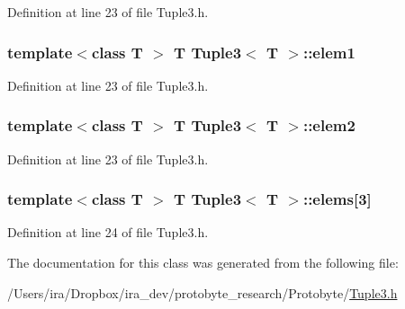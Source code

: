 Definition at line 23 of file Tuple3.\-h.

\hypertarget{class_tuple3_ac4a0bc9d329cd769ee09034011d60129}{
\subsubsection[{elem1}]{\setlength{\rightskip}{0pt plus 5cm}template$<$class T $>$ T {\bf Tuple3}$<$ T $>$\-::elem1}}\label{class_tuple3_ac4a0bc9d329cd769ee09034011d60129}


Definition at line 23 of file Tuple3.\-h.

\hypertarget{class_tuple3_aa75fc6d2c8fcea235466082d4369a8cf}{
\subsubsection[{elem2}]{\setlength{\rightskip}{0pt plus 5cm}template$<$class T $>$ T {\bf Tuple3}$<$ T $>$\-::elem2}}\label{class_tuple3_aa75fc6d2c8fcea235466082d4369a8cf}


Definition at line 23 of file Tuple3.\-h.

\hypertarget{class_tuple3_a43262e27fc9d8fb4cc9fe69a2fa181ed}{
\subsubsection[{elems}]{\setlength{\rightskip}{0pt plus 5cm}template$<$class T $>$ T {\bf Tuple3}$<$ T $>$\-::elems\mbox{[}3\mbox{]}}}\label{class_tuple3_a43262e27fc9d8fb4cc9fe69a2fa181ed}


Definition at line 24 of file Tuple3.\-h.



The documentation for this class was generated from the following file\-:\begin{DoxyCompactItemize}
\item 
/\-Users/ira/\-Dropbox/ira\-\_\-dev/protobyte\-\_\-research/\-Protobyte/\hyperlink{_tuple3_8h}{Tuple3.\-h}\end{DoxyCompactItemize}
